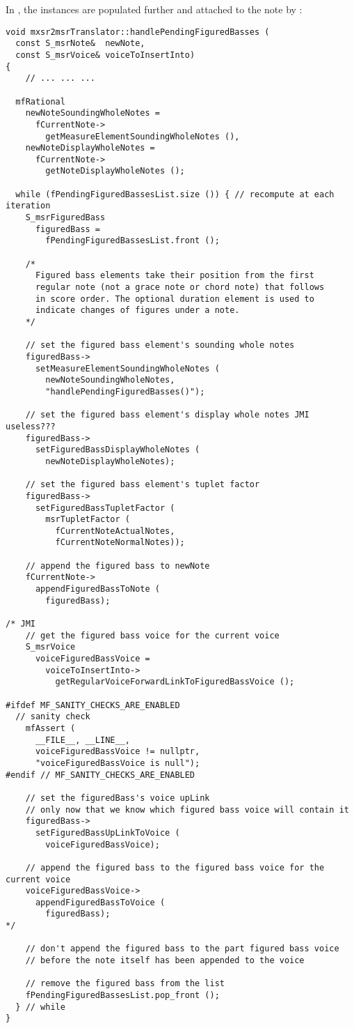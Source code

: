 In , the  instances are populated further and attached to the note by :
\begin{lstlisting}[language=CPlusPlus]
void mxsr2msrTranslator::handlePendingFiguredBasses (
  const S_msrNote&  newNote,
  const S_msrVoice& voiceToInsertInto)
{
	// ... ... ...

  mfRational
    newNoteSoundingWholeNotes =
      fCurrentNote->
        getMeasureElementSoundingWholeNotes (),
    newNoteDisplayWholeNotes =
      fCurrentNote->
        getNoteDisplayWholeNotes ();

  while (fPendingFiguredBassesList.size ()) { // recompute at each iteration
    S_msrFiguredBass
      figuredBass =
        fPendingFiguredBassesList.front ();

    /*
      Figured bass elements take their position from the first
      regular note (not a grace note or chord note) that follows
      in score order. The optional duration element is used to
      indicate changes of figures under a note.
    */

    // set the figured bass element's sounding whole notes
    figuredBass->
      setMeasureElementSoundingWholeNotes (
        newNoteSoundingWholeNotes,
        "handlePendingFiguredBasses()");

    // set the figured bass element's display whole notes JMI useless???
    figuredBass->
      setFiguredBassDisplayWholeNotes (
        newNoteDisplayWholeNotes);

    // set the figured bass element's tuplet factor
    figuredBass->
      setFiguredBassTupletFactor (
        msrTupletFactor (
          fCurrentNoteActualNotes,
          fCurrentNoteNormalNotes));

    // append the figured bass to newNote
    fCurrentNote->
      appendFiguredBassToNote (
        figuredBass);

/* JMI
    // get the figured bass voice for the current voice
    S_msrVoice
      voiceFiguredBassVoice =
        voiceToInsertInto->
          getRegularVoiceForwardLinkToFiguredBassVoice ();

#ifdef MF_SANITY_CHECKS_ARE_ENABLED
  // sanity check
    mfAssert (
      __FILE__, __LINE__,
      voiceFiguredBassVoice != nullptr,
      "voiceFiguredBassVoice is null");
#endif // MF_SANITY_CHECKS_ARE_ENABLED

    // set the figuredBass's voice upLink
    // only now that we know which figured bass voice will contain it
    figuredBass->
      setFiguredBassUpLinkToVoice (
        voiceFiguredBassVoice);

    // append the figured bass to the figured bass voice for the current voice
    voiceFiguredBassVoice->
      appendFiguredBassToVoice (
        figuredBass);
*/

    // don't append the figured bass to the part figured bass voice
    // before the note itself has been appended to the voice

    // remove the figured bass from the list
    fPendingFiguredBassesList.pop_front ();
  } // while
}
\end{lstlisting}

